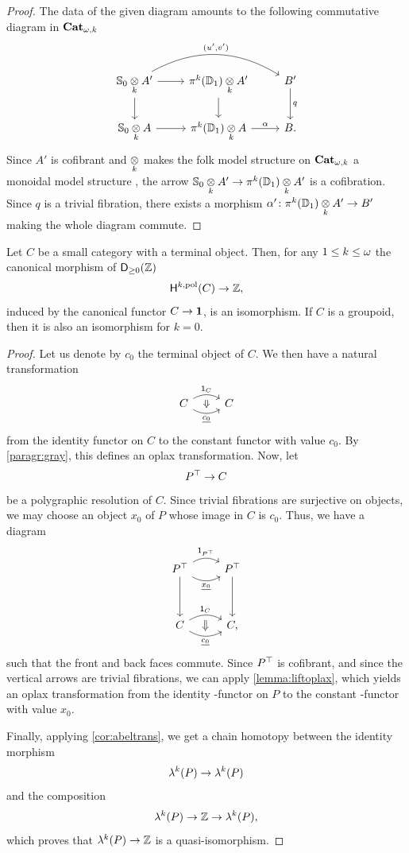 \begin{proof}
  The data of the given diagram amounts to the following commutative
  diagram in $\mathbf{Cat}_{\omega,k}$
  \[
    \begin{tikzcd}
      \Sph{0} \grayk{k} A' \ar[r]\ar[d] \ar[rr,bend
      left,"{(u',v')}"]& \opifun{k}(\Dsk{1}) \grayk{k} A'
      \ar[d]& B' \ar[d,"q"] \\
      \Sph{0} \grayk{k} A \ar[r] & \opifun{k}(\Dsk{1}) \grayk{k} A \ar[r,"\alpha"]
      & B.
    \end{tikzcd}
  \]
  Since $A'$ is cofibrant and $\underset{k}{\otimes}$ makes the folk model
  structure on $\mathbf{Cat}_{\omega,k}$ a monoidal model structure \cite{ara_lucas:folmon}, the
  arrow $ \mathbb{S}_{0}  \underset{k}{\otimes} A' \to  \mathsf{\pi}_{}^{k}(\mathbb{D}_{1}) \underset{k}{\otimes} A'$ is a
  cofibration. Since $q$ is a trivial fibration, there exists a
  morphism $\alpha' \colon \mathsf{\pi}_{}^{k}(\mathbb{D}_{1})  \underset{k}{\otimes} A' \to B'$ making the
  whole diagram commute.
\end{proof}
\begin{proposition}\label{prop:hlgycontrcat}
  Let $C$ be a small category with a terminal object. Then, for any $1
  \leq k \leq \omega$ the
  canonical morphism of $\mathsf{D}_{\geq 0}(\mathbb Z)$
  \[
    \mathsf{H}^{k,\mathrm{pol}}(C) \to \mathbb Z,
  \]
  induced by the canonical functor $C \to \mathbf{1}$, is an
  isomorphism. If $C$ is a groupoid, then it is also an isomorphism
  for $k=0$.
\end{proposition}
\begin{proof}
  Let us denote by $c_0$ the terminal object of $C$. We then have a
  natural transformation
    \[
    \begin{tikzcd}
      C \ar[r,bend left,"\Unit{C}",""{name=A,below}]
      \ar[r,bend right,"\cst{c_0}"',""{name=B,above}] & C
      \ar[from=A,to=B,Rightarrow]
    \end{tikzcd}
  \]
  from the identity functor on $C$ to the constant functor with value
  $c_0$.  By \ref{paragr:gray}, this defines an oplax
  transformation. Now, let
  \[
    P^\top \to C
  \]
  be a polygraphic resolution of $C$. Since trivial fibrations are
  surjective on objects, we may choose an object $x_0$ of $P$ whose image in
  $C$ is $c_0$. Thus, we have a diagram
  \[
    \begin{tikzcd}[row sep=huge]
      \frgp{P} \ar[d]\ar[r,bend left,"\Unit{\frgp{P}}"] \ar[r,bend
      right,"\cst{x_0}"']& \frgp{P} \ar[d] \\
      C \ar[r,bend left,"\Unit{C}",""{name=A,below}] \ar[r,bend
      right,"\cst{c_0}"',""{name=B,above}]& C,
      \ar[from=A,to=B,Rightarrow]
    \end{tikzcd}
  \]
  such that the front and back faces commute. Since
  $P^\top$ is cofibrant, and since the vertical arrows are trivial
  fibrations, we can apply \cref{lemma:liftoplax}, which yields an
  oplax transformation from the identity \oo\nbd-functor on $P$ to
  the constant \oo\nbd-functor with value $x_0$.

  Finally, applying \cref{cor:abeltrans}, we get a chain homotopy
  between the identity morphism \[\mathsf{\mathsf{\lambda}}^{k}(P) \to
    \mathsf{\mathsf{\lambda}}^{k}(P)\] and the composition
  \[\mathsf{\mathsf{\lambda}}^{k}(P) \to \mathbb Z \to
  \mathsf{\mathsf{\lambda}}^{k}(P),\] which proves that  $\mathsf{\mathsf{\lambda}}^{k}(P) \to
  \mathbb Z$ is a quasi-isomorphism.
\end{proof}

